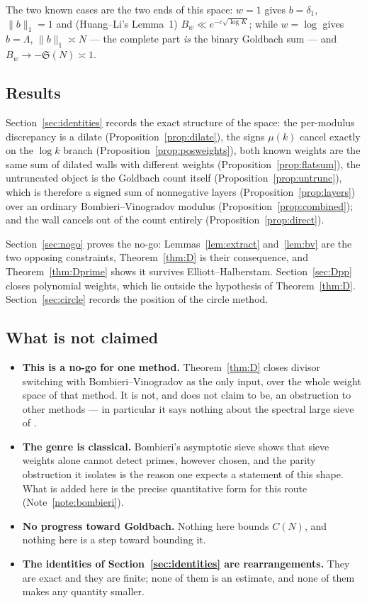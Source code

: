\documentclass[11pt,a4paper]{article}
\theoremstyle{plain}
\theoremstyle{definition}
\theoremstyle{remark}
\renewcommand{\SS}{\mathfrak{S}}
\begin{document}
The two known cases are the two ends of this space: $w=1$ gives
$b=\delta_1$, $\|b\|_1=1$ and (Huang--Li's Lemma~1)
$B_w\ll e^{-c\sqrt{\log K}}$; while $w=\log$ gives $b=\Lambda$,
$\|b\|_1\asymp N$ --- the complete part \emph{is} the binary Goldbach
sum --- and $B_w\to-\SS(N)\asymp1$.

\subsection{Results}

Section~\ref{sec:identities} records the exact structure of the space:
the per-modulus discrepancy is a dilate (Proposition~\ref{prop:dilate}),
the signs $\mu(k)$ cancel exactly on the $\log k$ branch
(Proposition~\ref{prop:posweights}), both known weights are the same
sum of dilated walls with different weights
(Proposition~\ref{prop:flatsum}), the untruncated object is the
Goldbach count itself (Proposition~\ref{prop:untrunc}), which is
therefore a signed sum of nonnegative layers
(Proposition~\ref{prop:layers}) over an ordinary
Bombieri--Vinogradov modulus (Proposition~\ref{prop:combined}); and
the wall cancels out of the count entirely
(Proposition~\ref{prop:direct}).

Section~\ref{sec:nogo} proves the no-go: Lemmas~\ref{lem:extract}
and~\ref{lem:bv} are the two opposing constraints,
Theorem~\ref{thm:D} is their consequence, and
Theorem~\ref{thm:Dprime} shows it survives Elliott--Halberstam.
Section~\ref{sec:Dpp} closes polynomial weights, which lie outside
the hypothesis of Theorem~\ref{thm:D}. Section~\ref{sec:circle}
records the position of the circle method.

\subsection{What is not claimed}\label{sec:notclaimed}

\begin{itemize}
\item \textbf{This is a no-go for one method.} Theorem~\ref{thm:D}
closes divisor switching with Bombieri--Vinogradov as the only input,
over the whole weight space of that method. It is not, and does not
claim to be, an obstruction to other methods --- in particular it says
nothing about the spectral large sieve of \cite{Li23}.

\item \textbf{The genre is classical.} Bombieri's asymptotic sieve
\cite{Bom76} shows that sieve weights alone cannot detect primes,
however chosen, and the parity obstruction it isolates is the reason
one expects a statement of this shape. What is added here is the
precise quantitative form for this route
(Note~\ref{note:bombieri}).

\item \textbf{No progress toward Goldbach.} Nothing here bounds
$C(N)$, and nothing here is a step toward bounding it.

\item \textbf{The identities of Section~\ref{sec:identities} are
rearrangements.} They are exact and they are finite; none of them is
an estimate, and none of them makes any quantity smaller.
\end{itemize}
\end{document}
